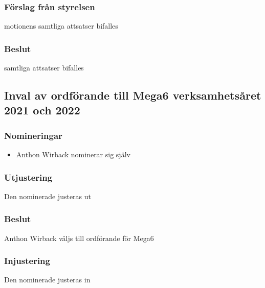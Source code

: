 \documentclass[protokoll]{dvd}
\begin{document}
    \subsubsection*{Förslag från styrelsen}
        \begin{attsatser}
            \item motionens samtliga attsatser bifalles
        \end{attsatser}


    \subsubsection*{Beslut}
        \begin{attsatser}
            \item samtliga attsatser bifalles
        \end{attsatser}

\subsection{Inval av ordförande till Mega6 verksamhetsåret 2021 och 2022}

    \subsubsection*{Nomineringar}

        \begin{itemize}
            \item Anthon Wirback nominerar sig själv
        \end{itemize}

        \subsubsection*{Utjustering}
        Den nominerade justeras ut

        \subsubsection*{Beslut}
            \begin{attsatser}
                \item Anthon Wirback väljs till ordförande för Mega6
            \end{attsatser}

        \subsubsection*{Injustering}
        Den nominerade justeras in
\end{document}
